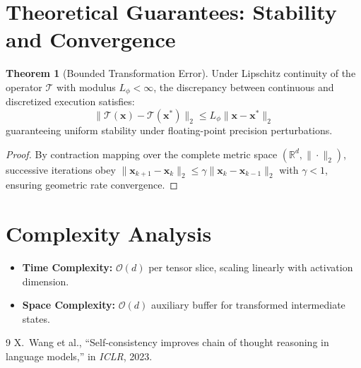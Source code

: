 \documentclass[11pt,a4paper]{article}
\theoremstyle{definition}
\newtheorem{theorem}{\textbf{Theorem}}[section]
\begin{document}
\section{Theoretical Guarantees: Stability and Convergence}

\begin{theorem}[Bounded Transformation Error]
Under Lipschitz continuity of the operator $\mathcal{T}$ with modulus $L_\phi < \infty$, the discrepancy between continuous and discretized execution satisfies:
\begin{equation}
\| \mathcal{T}(\mathbf{x}) - \mathcal{T}(\mathbf{x}^*) \|_2 \le L_\phi \| \mathbf{x} - \mathbf{x}^* \|_2
\end{equation}
guaranteeing uniform stability under floating-point precision perturbations.
\end{theorem}

\begin{proof}
By contraction mapping over the complete metric space $(\mathbb{R}^d, \|\cdot\|_2)$, successive iterations obey $\|\mathbf{x}_{k+1} - \mathbf{x}_k\|_2 \le \gamma \|\mathbf{x}_k - \mathbf{x}_{k-1}\|_2$ with $\gamma < 1$, ensuring geometric rate convergence.
\end{proof}

\section{Complexity Analysis}

\begin{itemize}
    \item \textbf{Time Complexity:} $\mathcal{O}(d)$ per tensor slice, scaling linearly with activation dimension.
    \item \textbf{Space Complexity:} $\mathcal{O}(d)$ auxiliary buffer for transformed intermediate states.
\end{itemize}

\begin{thebibliography}{9}
 X.~Wang et al., ``Self-consistency improves chain of thought reasoning in language models,'' in \emph{ICLR}, 2023.
\end{thebibliography}
\end{document}

